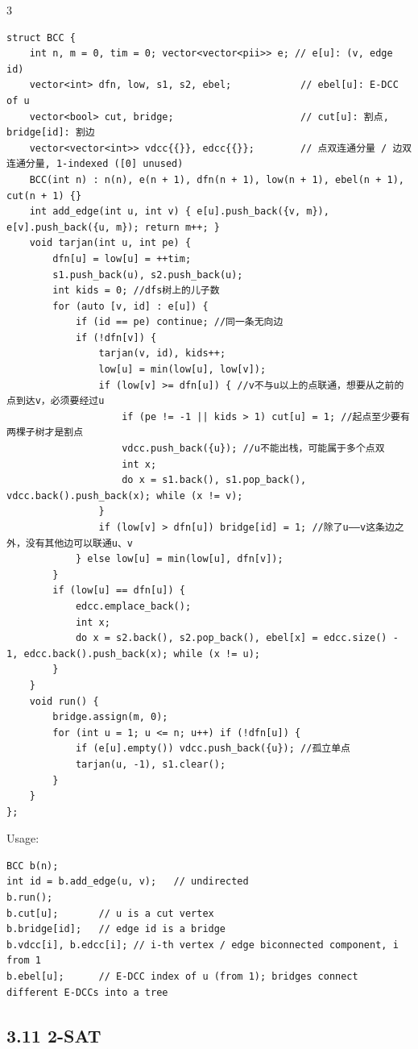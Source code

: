 \documentclass[8pt]{extarticle}
\begin{document}
\begin{multicols*}{3}
\begin{lstlisting}
struct BCC {
    int n, m = 0, tim = 0; vector<vector<pii>> e; // e[u]: (v, edge id)
    vector<int> dfn, low, s1, s2, ebel;            // ebel[u]: E-DCC of u
    vector<bool> cut, bridge;                      // cut[u]: 割点, bridge[id]: 割边
    vector<vector<int>> vdcc{{}}, edcc{{}};        // 点双连通分量 / 边双连通分量, 1-indexed ([0] unused)
    BCC(int n) : n(n), e(n + 1), dfn(n + 1), low(n + 1), ebel(n + 1), cut(n + 1) {}
    int add_edge(int u, int v) { e[u].push_back({v, m}), e[v].push_back({u, m}); return m++; }
    void tarjan(int u, int pe) {
        dfn[u] = low[u] = ++tim;
        s1.push_back(u), s2.push_back(u);
        int kids = 0; //dfs树上的儿子数
        for (auto [v, id] : e[u]) {
            if (id == pe) continue; //同一条无向边
            if (!dfn[v]) {
                tarjan(v, id), kids++;
                low[u] = min(low[u], low[v]);
                if (low[v] >= dfn[u]) { //v不与u以上的点联通，想要从之前的点到达v，必须要经过u
                    if (pe != -1 || kids > 1) cut[u] = 1; //起点至少要有两棵子树才是割点
                    vdcc.push_back({u}); //u不能出栈，可能属于多个点双
                    int x;
                    do x = s1.back(), s1.pop_back(), vdcc.back().push_back(x); while (x != v);
                }
                if (low[v] > dfn[u]) bridge[id] = 1; //除了u——v这条边之外，没有其他边可以联通u、v
            } else low[u] = min(low[u], dfn[v]);
        }
        if (low[u] == dfn[u]) {
            edcc.emplace_back();
            int x;
            do x = s2.back(), s2.pop_back(), ebel[x] = edcc.size() - 1, edcc.back().push_back(x); while (x != u);
        }
    }
    void run() {
        bridge.assign(m, 0);
        for (int u = 1; u <= n; u++) if (!dfn[u]) {
            if (e[u].empty()) vdcc.push_back({u}); //孤立单点
            tarjan(u, -1), s1.clear();
        }
    }
};
\end{lstlisting}

Usage:

\begin{lstlisting}
BCC b(n);
int id = b.add_edge(u, v);   // undirected
b.run();
b.cut[u];       // u is a cut vertex
b.bridge[id];   // edge id is a bridge
b.vdcc[i], b.edcc[i]; // i-th vertex / edge biconnected component, i from 1
b.ebel[u];      // E-DCC index of u (from 1); bridges connect different E-DCCs into a tree
\end{lstlisting}

\subsection*{3.11 2-SAT}


\end{multicols*}
\end{document}
